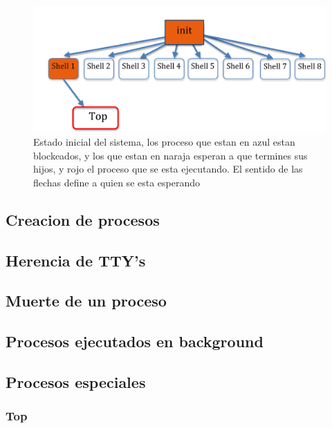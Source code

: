 \documentclass[10pt,a4paper]{article}
\begin{document}
	\begin{figure}
	\begin{center} 
	\includegraphics[angle=0, width=1\textwidth ]{proceso2.png} 
	\caption{Estado inicial del sistema, los proceso que estan en azul estan blockeados, y los que estan en naraja esperan a que termines sus hijos, y rojo el proceso que se esta ejecutando. El sentido de las flechas define a quien se esta esperando}
	\end{center} 
	\end{figure}

	\subsection{Creacion de procesos}
	\subsection{Herencia de TTY's}
	\subsection{Muerte de un proceso}
	\subsection{Procesos ejecutados en background}
	\subsection{Procesos especiales}
	\subsubsection{Top}
\end{document}
